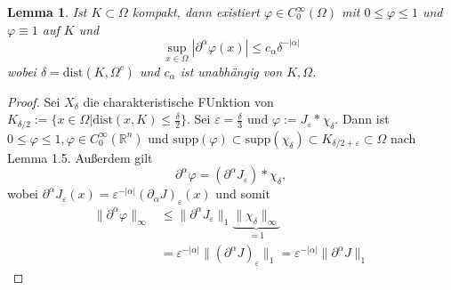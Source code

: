 \documentclass[
paper=a4,
bibtotocnumbered,
liststotocnumbered,
tablecaptionabove,
pointlessnumbers,
twoside,
openright,
10pt
]
{report}
\newcommand{\dist}{\mathrm{dist}}
\let\phi\varphi
\newtheorem{lem}[thm]{Lemma}
\theoremstyle{definition}
\numberwithin{equation}{chapter}
\begin{document}
\begin{lem}\label{2.4}
Ist $K\subset \Omega$ kompakt, dann existiert $\phi \in C_0^\infty(\Omega)$ mit $0\le \phi \le 1$ und $\phi \equiv 1$ auf $K$ und
$$
\sup_{x\in \Omega} |\partial^\alpha \phi(x)|\le c_\alpha \delta^{-|\alpha|}
$$ 
wobei $\delta = \dist(K, \Omega^c)$ und $c_\alpha$ ist unabhängig von $K, \Omega$.
\end{lem}
\begin{proof}
Sei $X_\delta$ die charakteristische FUnktion von $K_{\delta/2}:= \{x\in \Omega|\text{dist} (x,K) \le \frac{\delta}{2}\}$. Sei $\varepsilon = \frac{\delta}{3}$ und $\phi:= J_\varepsilon * \chi_\delta$. Dann ist $0 \le \phi \le 1, \phi \in C_0^\infty(\mathbb R^n)$ und $\text{supp}(\phi) \subset \text{supp}(\chi_\delta) \subset K_{\delta/2+ \varepsilon} \subset \Omega$ nach Lemma 1.5. Außerdem gilt
$$
\partial^\alpha \phi = (\partial^\alpha J_\varepsilon) * \chi_\delta,
$$ 
wobei $\partial^\alpha J_\varepsilon(x) = \varepsilon^{-|\alpha|} (\partial_\alpha J)_\varepsilon (x)$ und somit
\begin{align*}
\|\partial^\alpha \phi\|_\infty &\le \| \partial^\alpha J_\varepsilon \|_1 \underbrace{\| \chi_\delta\|_\infty}_{=1} \\
&= \varepsilon^{-|\alpha|} \| (\partial^\alpha J)_\varepsilon\|_1 = \varepsilon^{-|\alpha|} \| \partial^\alpha J\|_1
\end{align*} 
\end{proof}
\end{document}
